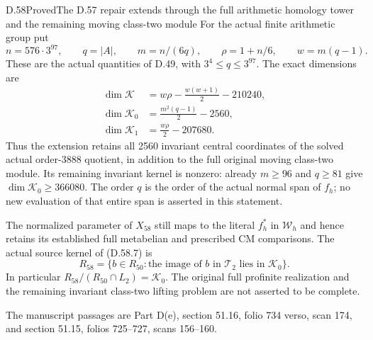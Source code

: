 \begin{statement}{D.58}{Proved}{The D.57 repair extends through the full arithmetic homology tower and the remaining moving class-two module}
For the actual finite arithmetic group put
\[
 n=576\cdot3^{97},\qquad q=|A|,\qquad
 m=n/(6q),\qquad \rho=1+n/6,\qquad w=m(q-1).
\]
These are the actual quantities of D.49, with
\(3^4\leq q\leq3^{97}\). The exact dimensions are
\[
 \begin{aligned}
 \dim\mathcal K
    &=w\rho-\frac{w(w+1)}2-210240,\\
 \dim\mathcal K_0
    &=\frac{m^2(q-1)}2-2560,\\
 \dim\mathcal K_1
    &=\frac{w\rho}{2}-207680.
 \end{aligned}
 \tag{D.58.8}
\]
Thus the extension retains all 2560 invariant central
coordinates of the solved actual order-3888 quotient,
in addition to the full original moving class-two
module. Its remaining invariant kernel is nonzero:
already \(m\geq96\) and \(q\geq81\) give
\(\dim\mathcal K_0\geq366080\).
The order \(q\) is the order of the actual normal span
of \(f_h\); no new evaluation of that entire span is
asserted in this statement.

The normalized parameter of \(X_{58}\) still maps to
the literal \(f_h^*\) in \(\mathcal W_h\) and hence
retains its established full metabelian and prescribed
CM comparisons. The actual source kernel of (D.58.7) is
\[
 R_{58}=\{b\in R_{50}:
           \text{the image of }b\text{ in }\mathcal T_2
                          \text{ lies in }\mathcal K_0\}.
 \tag{D.58.9}
\]
In particular
\(R_{58}/(R_{50}\cap L_2)=\mathcal K_0\).
The original full profinite realization and the
remaining invariant class-two lifting problem are
not asserted to be complete.

The manuscript passages are Part D(e), section 51.16,
folio 734 verso, scan 174, and section 51.15,
folios 725--727, scans 156--160.
\end{statement}
